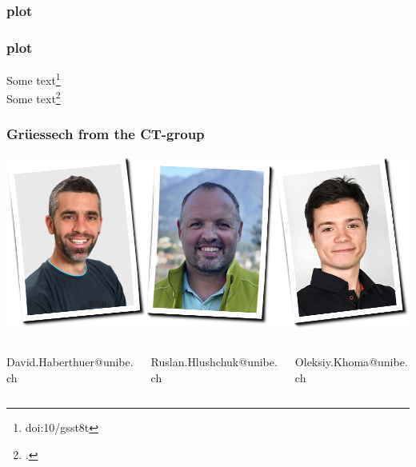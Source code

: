 \documentclass[aspectratio=169]{beamer}
\newcommand{\imageheight}{0.618\paperheight}%
\newcommand{\uct}{{\textmu}CT\xspace}%
\begin{document}
\begin{frame}
\frametitle{plot}

\end{frame}

\begin{frame}
\frametitle{plot}
Some text\footnote{doi:10/gsst8t}\\
Some text\footcite{Haberthuer2023}
\end{frame}

\begin{frame}
	\frametitle{Grüessech from the \uct-group}
	\centering
	\includegraphics[height=\imageheight]{./images/team}
		\begin{columns}
		\hfill\begin{column}{0.33\textwidth}
			\centering%
			David{\color{ubRed!61.8}.}Haberthuer{\color{ubRed!61.8}@unibe.ch}%
		\end{column}
		\begin{column}{0.33\textwidth}
			\centering%
			Ruslan{\color{ubRed!61.8}.}Hlushchuk{\color{ubRed!61.8}@unibe.ch}%
		\end{column}
		\begin{column}{0.33\textwidth}
			\centering%
			Oleksiy{\color{ubRed!61.8}.}Khoma{\color{ubRed!61.8}@unibe.ch}%
		\end{column}\hfill%
	\end{columns}
\end{frame}
\end{document}
